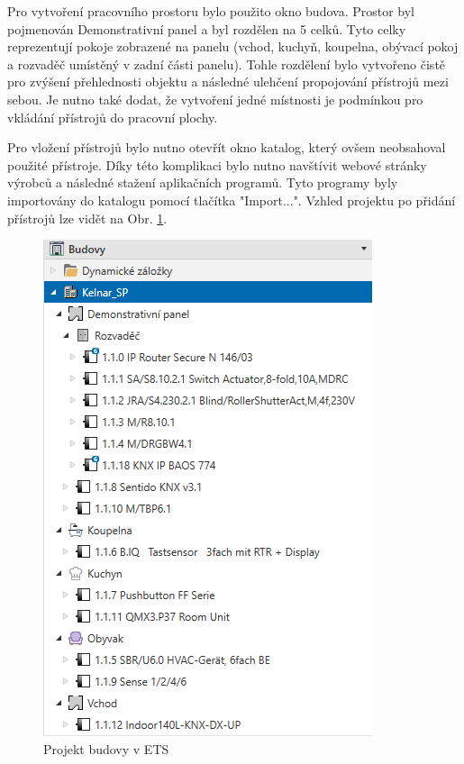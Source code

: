 Pro vytvoření pracovního prostoru bylo použito okno budova. Prostor byl pojmenován Demonstrativní panel a byl rozdělen na 5 celků. Tyto celky reprezentují pokoje zobrazené na panelu (vchod, kuchyň, koupelna, obývací pokoj a rozvaděč umístěný v zadní části panelu). Tohle rozdělení bylo vytvořeno čistě pro zvýšení přehlednosti objektu a následné ulehčení propojování přístrojů mezi sebou. Je nutno také dodat, že vytvoření jedné místnosti je podmínkou pro vkládání přístrojů do pracovní plochy.

Pro vložení přístrojů bylo nutno otevřít okno katalog, který ovšem neobsahoval použité přístroje. Díky této komplikaci bylo nutno navštívit webové stránky výrobců a následné stažení aplikačních programů. Tyto programy byly importovány do katalogu pomocí tlačítka "Import...". Vzhled projektu po přidání přístrojů lze vidět na Obr. \ref{fig:Projekt budovy v ETS}.

\begin{figure}[!h]
  \begin{center}
    \includegraphics[scale=0.7]{obrazky/Budova.png}
  \end{center}
  \caption[Projekt budovy v ETS]{Projekt budovy v ETS}
  \label{fig:Projekt budovy v ETS}
\end{figure}

